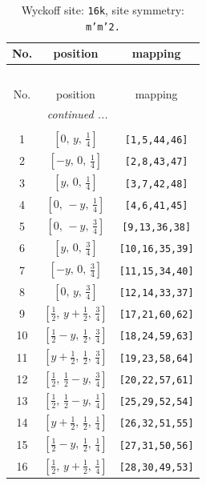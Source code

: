 \documentclass[fleqn,8pt]{jsarticle}
\begin{document}
\renewcommand{\arraystretch}{1.2}
\begin{longtable}{ccc}
\caption{Wyckoff site: {\tt 16k}, site symmetry: {\tt m'm'2.}}
 \\
 \hline \hline
No. & position & mapping \\ \hline \endfirsthead

\multicolumn{2}{l}{\tablename\ \thetable{}} \\
 \hline \hline
No. & position & mapping \\ \hline \endhead

 \hline \hline
\multicolumn{2}{r}{\footnotesize\it continued ...} \\ \endfoot

 \hline \hline
\multicolumn{2}{r}{} \\ \endlastfoot

1 & $\left[ 0,\, y,\, \frac{1}{4} \right]$ & {\tt [1,5,44,46]} \\ \hline
2 & $\left[ - y,\, 0,\, \frac{1}{4} \right]$ & {\tt [2,8,43,47]} \\ \hline
3 & $\left[ y,\, 0,\, \frac{1}{4} \right]$ & {\tt [3,7,42,48]} \\ \hline
4 & $\left[ 0,\, - y,\, \frac{1}{4} \right]$ & {\tt [4,6,41,45]} \\ \hline
5 & $\left[ 0,\, - y,\, \frac{3}{4} \right]$ & {\tt [9,13,36,38]} \\ \hline
6 & $\left[ y,\, 0,\, \frac{3}{4} \right]$ & {\tt [10,16,35,39]} \\ \hline
7 & $\left[ - y,\, 0,\, \frac{3}{4} \right]$ & {\tt [11,15,34,40]} \\ \hline
8 & $\left[ 0,\, y,\, \frac{3}{4} \right]$ & {\tt [12,14,33,37]} \\ \hline
9 & $\left[ \frac{1}{2},\, y + \frac{1}{2},\, \frac{3}{4} \right]$ & {\tt [17,21,60,62]} \\ \hline
10 & $\left[ \frac{1}{2} - y,\, \frac{1}{2},\, \frac{3}{4} \right]$ & {\tt [18,24,59,63]} \\ \hline
11 & $\left[ y + \frac{1}{2},\, \frac{1}{2},\, \frac{3}{4} \right]$ & {\tt [19,23,58,64]} \\ \hline
12 & $\left[ \frac{1}{2},\, \frac{1}{2} - y,\, \frac{3}{4} \right]$ & {\tt [20,22,57,61]} \\ \hline
13 & $\left[ \frac{1}{2},\, \frac{1}{2} - y,\, \frac{1}{4} \right]$ & {\tt [25,29,52,54]} \\ \hline
14 & $\left[ y + \frac{1}{2},\, \frac{1}{2},\, \frac{1}{4} \right]$ & {\tt [26,32,51,55]} \\ \hline
15 & $\left[ \frac{1}{2} - y,\, \frac{1}{2},\, \frac{1}{4} \right]$ & {\tt [27,31,50,56]} \\ \hline
16 & $\left[ \frac{1}{2},\, y + \frac{1}{2},\, \frac{1}{4} \right]$ & {\tt [28,30,49,53]} \\
\end{longtable}
\end{document}
